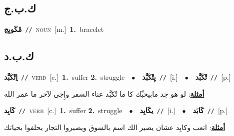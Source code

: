 \documentclass[10pt,a4paper,twoside]{article} %
\begin{document}
\begin{multicols}{2}
{{{{{{{\vspace{-3mm}
\subsection*{\color{blue}\foreignlanguage{arabic}{ك.ب.ج}\color{blue}{}} 

{\setlength\topsep{0pt}\textbf{\foreignlanguage{arabic}{مْكَوبِج}}\ {\color{gray}\texttt{//}\color{black}}\ \textsc{noun}\ [m.]\ \textbf{1.}~bracelet\ 

\vspace{-3mm}
\subsection*{\color{blue}\foreignlanguage{arabic}{ك.ب.د}\color{blue}{}} 

{\setlength\topsep{0pt}\textbf{\foreignlanguage{arabic}{اِتْكَبَّد}}\ {\color{gray}\texttt{//}\color{black}}\ \textsc{verb}\ [c.]\ \textbf{1.}~suffer  \textbf{2.}~struggle\ \ $\bullet$\ \ \setlength\topsep{0pt}\textbf{\foreignlanguage{arabic}{يِتْكَبَّد}}\ {\color{gray}\texttt{//}\color{black}}\ [i.]\ \ $\bullet$\ \ \setlength\topsep{0pt}\textbf{\foreignlanguage{arabic}{تْكَبَّد}}\ {\color{gray}\texttt{//}\color{black}}\ [p.]\  \begin{flushright}\color{gray}\foreignlanguage{arabic}{\textbf{\underline{\foreignlanguage{arabic}{أمثلة}}}: لو هو جد مابيحبِّك كا ما تْكَبَّد عناء السفر وإِجى لآخر ما عمر الله}\end{flushright}\color{black}} \vspace{2mm}

{\setlength\topsep{0pt}\textbf{\foreignlanguage{arabic}{كَابِد}}\ {\color{gray}\texttt{//}\color{black}}\ \textsc{verb}\ [c.]\ \textbf{1.}~suffer  \textbf{2.}~struggle\ \ $\bullet$\ \ \setlength\topsep{0pt}\textbf{\foreignlanguage{arabic}{يكَابِد}}\ {\color{gray}\texttt{//}\color{black}}\ [i.]\ \ $\bullet$\ \ \setlength\topsep{0pt}\textbf{\foreignlanguage{arabic}{كَابَد}}\ {\color{gray}\texttt{//}\color{black}}\ [p.]\  \begin{flushright}\color{gray}\foreignlanguage{arabic}{\textbf{\underline{\foreignlanguage{arabic}{أمثلة}}}: اتعب وكابِد عشان يصير الك اسم بالسوق ويصيروا التجار يحلفوا بحياتك}\end{flushright}\color{black}} \vspace{2mm}

}}}}}}}}
\end{multicols}
\end{document}
